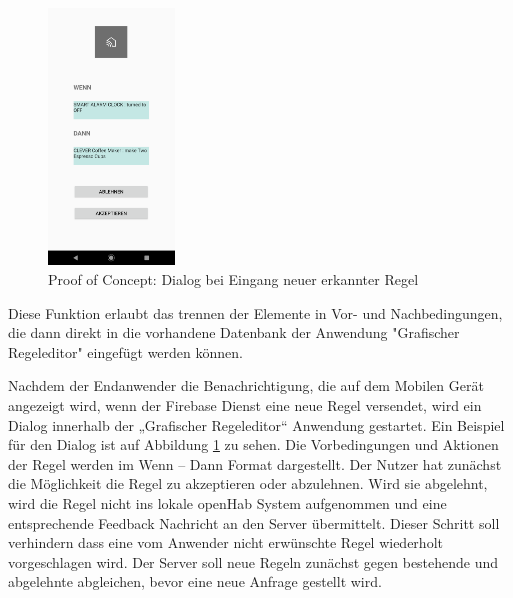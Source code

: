 \begin{figure}
  \begin{center}
    \includegraphics[width=0.3\textwidth]{figures/Appbildungen/newRuleDialog.png}
  \end{center}
  \label{fig:appdialog}
  \caption{Proof of Concept: Dialog bei Eingang neuer erkannter Regel}
\end{figure}
\normalsize

Diese Funktion erlaubt das trennen der Elemente in Vor- und Nachbedingungen, die dann direkt in die vorhandene Datenbank der Anwendung "Grafischer Regeleditor" eingefügt werden können.

Nachdem der Endanwender die Benachrichtigung, die auf dem Mobilen Gerät angezeigt wird, wenn der Firebase Dienst eine neue Regel versendet, wird ein Dialog innerhalb der „Grafischer Regeleditor“ Anwendung gestartet. Ein Beispiel für den Dialog ist auf Abbildung \ref{fig:appdialog} zu sehen. Die Vorbedingungen und Aktionen der Regel werden im Wenn – Dann Format dargestellt. Der Nutzer hat zunächst die Möglichkeit die Regel zu akzeptieren oder abzulehnen. Wird sie abgelehnt, wird die Regel nicht ins lokale openHab System aufgenommen und eine entsprechende Feedback Nachricht an den Server übermittelt. Dieser Schritt soll verhindern dass eine vom Anwender nicht erwünschte Regel wiederholt vorgeschlagen wird. Der Server soll neue Regeln zunächst gegen bestehende und abgelehnte abgleichen, bevor eine neue Anfrage gestellt wird.

